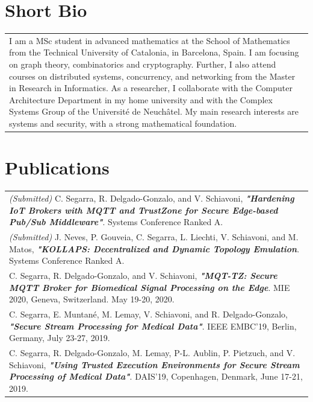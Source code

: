 \documentclass[a4paper,10pt]{article} %
\begin{document}
\section{Short Bio}
\begin{tabular}{p{}}
    I am a MSc student in advanced mathematics at the School of Mathematics from the Technical University of Catalonia, in Barcelona, Spain.
    I am focusing on graph theory, combinatorics and cryptography.
    Further, I also attend courses on distributed systems, concurrency, and networking from the Master in Research in Informatics.
    As a researcher, I collaborate with the Computer Architecture Department in my home university and with the Complex Systems Group of the Universit\'e de Neuch\^atel. 
    My main research interests are systems and security, with a strong mathematical foundation.
\end{tabular}

\section{Publications}
\begin{tabular}{p{}}
    \textit{(Submitted)} C. Segarra, R. Delgado-Gonzalo, and V. Schiavoni, \textbf{\textit{"Hardening IoT Brokers with MQTT and TrustZone for Secure Edge-based Pub/Sub Middleware"}}. Systems Conference Ranked A. \\[3pt]
    \textit{(Submitted)} J. Neves, P. Gouveia, C. Segarra, L. Liechti, V. Schiavoni, and M. Matos, \textbf{\textit{"KOLLAPS: Decentralized and Dynamic Topology Emulation}}. Systems Conference Ranked A. \\[3pt]
    C. Segarra, R. Delgado-Gonzalo, and V. Schiavoni, \textbf{\textit{"MQT-TZ: Secure MQTT Broker for Biomedical Signal Processing on the Edge}}. MIE 2020, Geneva, Switzerland. May 19-20, 2020. \\[3pt]
    C. Segarra, E. Muntan\'e, M. Lemay, V. Schiavoni, and  R. Delgado-Gonzalo, \textbf{\textit{"Secure Stream Processing for Medical Data"}}. IEEE EMBC'19, Berlin, Germany, July 23-27, 2019. \\[3pt]
    C. Segarra, R. Delgado-Gonzalo, M. Lemay, P-L. Aublin, P. Pietzuch, and V. Schiavoni, \textbf{\textit{"Using Trusted Execution Environments for Secure Stream Processing of Medical Data"}}. DAIS'19, Copenhagen, Denmark, June 17-21, 2019. \\
\end{tabular}
\end{document}
